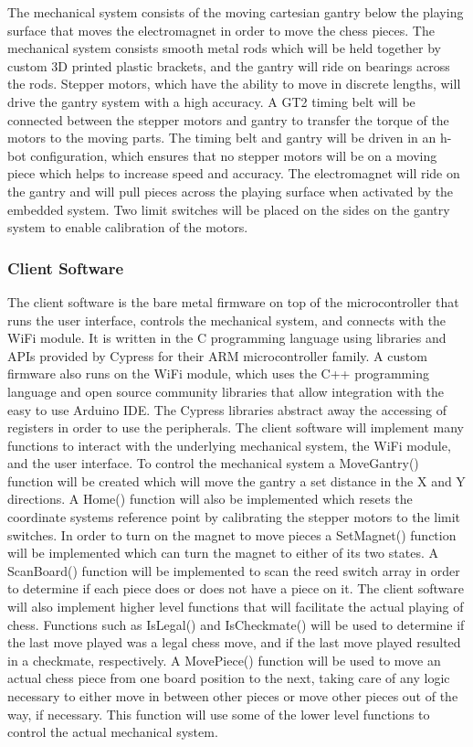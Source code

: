 \documentclass{article}
\begin{document}
The mechanical system consists of the moving cartesian gantry below the playing surface that moves the electromagnet in order to move the chess pieces. The mechanical system consists smooth metal rods which will be held together by custom 3D printed plastic brackets, and the gantry will ride on bearings across the rods. Stepper motors, which have the ability to move in discrete lengths, will drive the gantry system with a high accuracy. A GT2 timing belt will be connected between the stepper motors and gantry to transfer the torque of the motors to the moving parts. The timing belt and gantry will be driven in an h-bot configuration, which ensures that no stepper motors will be on a moving piece which helps to increase speed and accuracy. The electromagnet will ride on the gantry and will pull pieces across the playing surface when activated by the embedded system. Two limit switches will be placed on the sides on the gantry system to enable calibration of the motors.

\subsubsection*{Client Software}
\indent

The client software is the bare metal firmware on top of the microcontroller that runs the user interface, controls the mechanical system, and connects with the WiFi module. It is written in the C programming language using libraries and APIs provided by Cypress for their ARM microcontroller family. A custom firmware also runs on the WiFi module, which uses the C++ programming language and open source community libraries that allow integration with the easy to use Arduino IDE. The Cypress libraries abstract away the accessing of registers in order to use the peripherals. The client software will implement many functions to interact with the underlying mechanical system, the WiFi module, and the user interface. To control the mechanical system a MoveGantry() function will be created which will move the gantry a set distance in the X and Y directions. A Home() function will also be implemented which resets the coordinate systems reference point by calibrating the stepper motors to the limit switches. In order to turn on the magnet to move pieces a SetMagnet() function will be implemented which can turn the magnet to either of its two states. A ScanBoard() function will be implemented to scan the reed switch array in order to determine if each piece does or does not have a piece on it. The client software will also implement higher level functions that will facilitate the actual playing of chess. Functions such as IsLegal() and IsCheckmate() will be used to determine if the last move played was a legal chess move, and if the last move played resulted in a checkmate, respectively. A MovePiece() function will be used to move an actual chess piece from one board position to the next, taking care of any logic necessary to either move in between other pieces or move other pieces out of the way, if necessary. This function will use some of the lower level functions to control the actual mechanical system.
\end{document}
